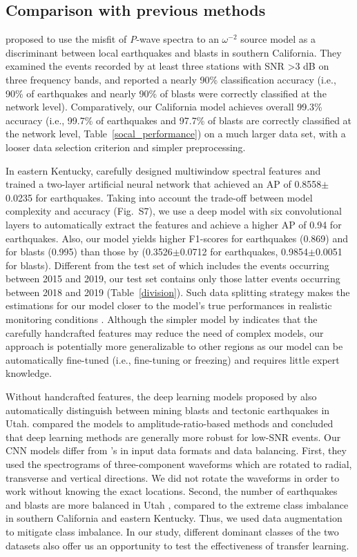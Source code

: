 \documentclass{gji}
\begin{document}
\subsection{Comparison with previous methods}
\cite{allmann} proposed to use the misfit of \textit{P}-wave spectra to an $\omega^{-2}$ source model as a discriminant between local earthquakes and blasts in southern California. They examined the events recorded by at least three stations with SNR \textgreater3 dB on three frequency bands, and reported a nearly 90\% classification accuracy (i.e., 90\% of earthquakes and nearly 90\% of blasts were correctly classified at the network level). Comparatively, our California model achieves overall 99.3\% accuracy (i.e., 99.7\% of earthquakes and 97.7\% of blasts are correctly classified at the network level, Table~\ref{socal_performance}) on a much larger data set, with a looser data selection criterion and simpler preprocessing.

In eastern Kentucky, \cite{miao} carefully designed multiwindow spectral features  and trained a two-layer artificial neural network that achieved an AP of 0.8558$\pm$0.0235 for earthquakes. Taking into account the trade-off between model complexity and accuracy (Fig.~S7), we use a deep model with six convolutional layers to automatically extract the features and achieve a higher AP of 0.94 for earthquakes. Also, our model yields higher F1-scores for earthquakes (0.869) and for blasts (0.995) than those by \cite{miao} (0.3526$\pm$0.0712 for earthquakes, 0.9854$\pm$0.0051 for blasts). Different from the test set of \cite{miao} which includes the events occurring between 2015 and 2019, our test set contains only those latter events occurring between 2018 and 2019 (Table~\ref{division}). Such data splitting strategy makes the estimations for our model closer to the model's true performances in realistic monitoring conditions \citep{linville_19}. Although the simpler model by \cite{miao} indicates that the carefully handcrafted features may reduce the need of complex models, our approach is potentially more generalizable to other regions as our model can be automatically fine-tuned (i.e., fine-tuning or freezing) and requires little expert knowledge.

Without handcrafted features, the deep learning models proposed by \cite{linville_19} also automatically distinguish between mining blasts and tectonic earthquakes in Utah. \cite{tibi_compare} compared the models to amplitude-ratio-based methods and concluded that deep learning methods are generally more robust for low-SNR events. Our CNN models differ from \citeauthor{linville_19}’s in input data formats and data balancing. First, they used the spectrograms of three-component waveforms which are rotated to radial, transverse and vertical directions. We did not rotate the waveforms in order to work without knowing the exact locations. Second, the number of earthquakes and blasts are more balanced in Utah \citep{linville_19,tibi_compare}, compared to the extreme class imbalance in southern California and eastern Kentucky. Thus, we used data augmentation to mitigate class imbalance. In our study, different dominant classes of the two datasets also offer us an opportunity to test the effectiveness of transfer learning.
\end{document}
